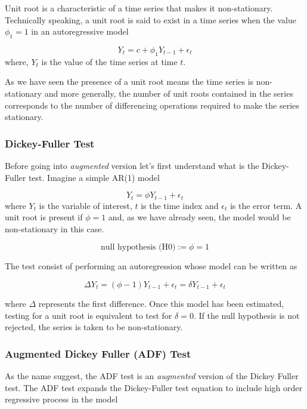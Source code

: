\documentclass[11pt]{article}
\begin{document}
Unit root is a characteristic of a time series that makes it
non-stationary. Technically speaking, a unit root is said to exist in a
time series when the value \(\phi_1 = 1\) in an autoregressive model

\[Y_t = c + \phi_1 Y_{t-1} + \epsilon_t\] where, \(Y_t\) is the value of
the time series at time \(t\).

As we have seen the presence of a unit root means the time series is
non-stationary and more generally, the number of unit roots contained in
the series corresponds to the number of differencing operations required
to make the series stationary.

\hypertarget{dickey-fuller-test}{%
\subsubsection{Dickey-Fuller Test}\label{dickey-fuller-test}}

Before going into \emph{augmented} version let's first understand what
is the Dickey-Fuller test. Imagine a simple AR(1) model

\[Y_t = \phi Y_{t − 1} + \epsilon_t\] where \(Y_t\) is the variable of
interest, \(t\) is the time index and \(\epsilon_t\) is the error term.
A unit root is present if \(\phi = 1\) and, as we have already seen, the
model would be non-stationary in this case.

\[\textrm{null hypothesis (H0)}:= \phi =1\]

The test consist of performing an autoregression whose model can be
written as

\[\Delta Y_t = (\phi − 1) Y_{t − 1} + \epsilon_t = \delta Y_{t − 1} + \epsilon_t\]

where \(\Delta\) represents the first difference. Once this model has
been estimated, testing for a unit root is equivalent to test for
\(\delta = 0\). If the null hypothesis is not rejected, the series is
taken to be non-stationary.

\hypertarget{augmented-dickey-fuller-adf-test}{%
\subsubsection{Augmented Dickey Fuller (ADF)
Test}\label{augmented-dickey-fuller-adf-test}}

As the name suggest, the ADF test is an \emph{augmented} version of the
Dickey Fuller test. The ADF test expands the Dickey-Fuller test equation
to include high order regressive process in the model
\end{document}
